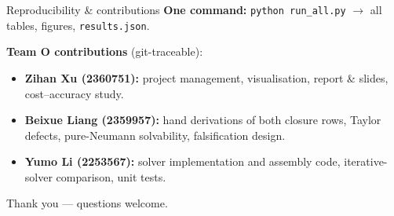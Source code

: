 \documentclass[aspectratio=169,11pt]{beamer}
\begin{document}
\begin{frame}{Reproducibility \& contributions}
\textbf{One command:} \texttt{python run\_all.py} $\rightarrow$ all
tables, figures, \texttt{results.json}.

\bigskip
\textbf{Team O contributions} (git-traceable):
\begin{itemize}
\item \textbf{Zihan Xu (2360751):} project management, visualisation,
      report \& slides, cost--accuracy study.
\item \textbf{Beixue Liang (2359957):} hand derivations of both closure
      rows, Taylor defects, pure-Neumann solvability, falsification
      design.
\item \textbf{Yumo Li (2253567):} solver implementation and assembly
      code, iterative-solver comparison, unit tests.
\end{itemize}

\bigskip
\centering\Large Thank you --- questions welcome.
\end{frame}
\end{document}

